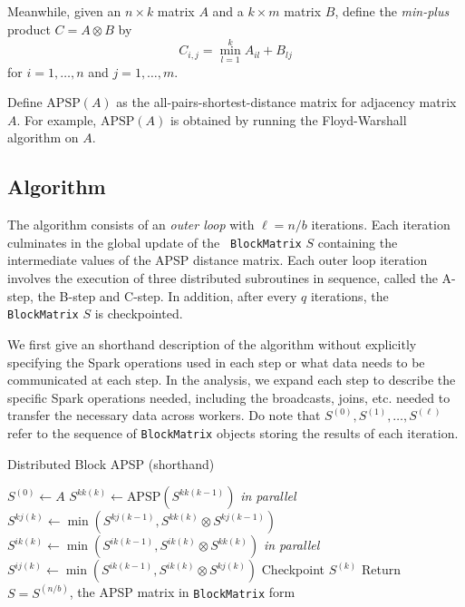 \documentclass{article} %
\begin{document}
Meanwhile, given an $n \times k$ matrix $A$ and a $k \times m$ matrix $B$, define
the \emph{min-plus} product $C = A \otimes B$ by
\[
C_{i,j} = \min_{l = 1}^k A_{il} + B_{lj}
\]
for $i = 1,\hdots, n$ and $j = 1,\hdots, m$.

Define $\text{APSP}(A)$ as the all-pairs-shortest-distance matrix for
adjacency matrix $A$.  For example, $\text{APSP}(A)$ is obtained by
running the Floyd-Warshall algorithm on $A$.

\subsection{Algorithm}

The algorithm consists of an \emph{outer loop} with $\ell = n/b$ iterations.
Each iteration culminates in the global update of the {\tt
  BlockMatrix} $S$ containing the intermediate values of the APSP
distance matrix.  Each outer loop iteration involves the execution of
three distributed subroutines in sequence, called the A-step, the
B-step and C-step.  In addition, after every $q$ iterations, the {\tt
  BlockMatrix} $S$ is checkpointed.

We first give an shorthand description of the algorithm without
explicitly specifying the Spark operations used in each step or what
data needs to be communicated at each step.  In the analysis, we
expand each step to describe the specific Spark operations needed,
including the broadcasts, joins, etc. needed to transfer the necessary
data across workers.  Do note that $S^{(0)}, S^{(1)},\hdots,
S^{(\ell)}$ refer to the sequence of {\tt BlockMatrix} objects storing
the results of each iteration.

\begin{algorithm}[H]
\caption{Distributed Block APSP (shorthand)}
\begin{algorithmic}
  \State $S^{(0)} \leftarrow A$
    \State [A-step]
    \State $S^{kk(k)} \leftarrow \text{APSP}(S^{kk(k-1)})$
    \State [B-step]
     \emph{in parallel}
        \State $S^{kj(k)} \leftarrow \min(S^{kj(k-1)}, S^{kk(k)} \otimes S^{kj(k-1)})$ 
      \EndIf
        \State $S^{ik(k)} \leftarrow \min(S^{ik(k-1)}, S^{ik(k)} \otimes S^{kk(k)})$
      \EndIf
    \EndFor
    \State [C-step]
     \emph{in parallel}
        \State $S^{ij(k)} \leftarrow \min(S^{ik(k-1)}, S^{ik(k)} \otimes S^{kj(k)})$
      \EndIf
    \EndFor
    \State [D-step]
      \State Checkpoint $S^{(k)}$
    \EndIf
  \EndFor
  \State Return $S = S^{(n/b)}$, the APSP matrix in {\tt BlockMatrix} form
\EndFunction
\end{algorithmic}
\end{algorithm}
\end{document}
